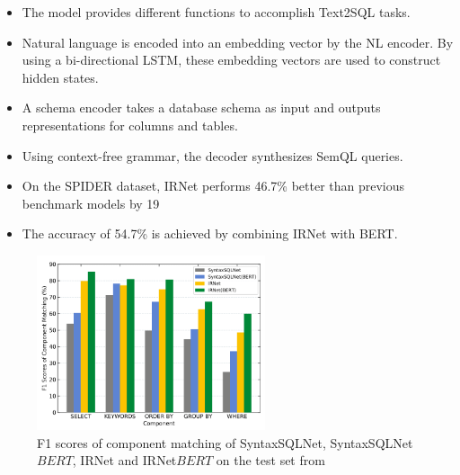 \begin{itemize}
    \item The model provides different functions to accomplish Text2SQL tasks.
    \item Natural language is encoded into an embedding vector by the NL encoder. By using a bi-directional LSTM, these embedding vectors are used to construct hidden states.
    \item A schema encoder takes a database schema as input and outputs representations for columns and tables.
    \item Using context-free grammar, the decoder synthesizes SemQL queries.
    \item On the SPIDER dataset, IRNet performs 46.7\% better than previous benchmark models by 19%
    \item The accuracy of 54.7\% is achieved by combining IRNet with BERT.
\end{itemize}

\begin{figure}[htb]
    \centering
    \includegraphics[width=0.6\textwidth]{pics/IRNet/f1}
    \caption{F1 scores of component matching of SyntaxSQLNet, SyntaxSQLNet\(BERT\), IRNet and IRNet\(BERT\) on the test set from \cite{DBLP:journals/corr/abs-1905-08205}}
    \label{fig:f1}
\end{figure}
